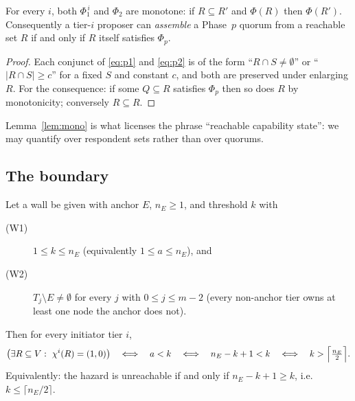 \begin{lemma}[Monotonicity]
\label{lem:mono}
For every $i$, both $\Phi_1^{\,i}$ and $\Phi_2$ are monotone: if
$R\subseteq R'$ and $\Phi(R)$ then $\Phi(R')$.  Consequently a tier-$i$
proposer can \emph{assemble} a Phase~$p$ quorum from a reachable set $R$ if
and only if $R$ itself satisfies $\Phi_p$.
\end{lemma}

\begin{proof}
Each conjunct of \eqref{eq:p1} and \eqref{eq:p2} is of the form
``$R\cap S\neq\emptyset$'' or ``$|R\cap S|\ge c$'' for a fixed $S$ and
constant $c$, and both are preserved under enlarging $R$.  For the
consequence: if some $Q\subseteq R$ satisfies $\Phi_p$ then so does $R$ by
monotonicity; conversely $R\subseteq R$.
\end{proof}

Lemma~\ref{lem:mono} is what licenses the phrase ``reachable capability
state'': we may quantify over respondent sets rather than over quorums.

\subsection{The boundary}

\begin{theorem}
\label{thm:boundary}
Let a wall be given with anchor $E$, $n_E\ge 1$, and threshold $k$ with
\begin{description}
  \item[(W1)] $1\le k\le n_E$ \quad(equivalently $1\le a\le n_E$), and
  \item[(W2)] $T_j\setminus E\neq\emptyset$ for every $j$ with
    $0\le j\le m-2$ \quad(every non-anchor tier owns at least one node the
    anchor does not).
\end{description}
Then for every initiator tier $i$,
\[
  \bigl(\exists R\subseteq V:\ \chi^i(R)=(1,0)\bigr)
  \quad\Longleftrightarrow\quad
  a<k
  \quad\Longleftrightarrow\quad
  n_E-k+1<k
  \quad\Longleftrightarrow\quad
  k>\Bigl\lceil \tfrac{n_E}{2}\Bigr\rceil .
\]
Equivalently: the hazard is unreachable if and only if
$n_E-k+1\ge k$, i.e.\ $k\le\lceil n_E/2\rceil$.
\end{theorem}

